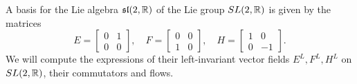 \documentclass[a4paper, 12pt]{article}
\begin{document}
\begin{Exercise}
    A basis for the Lie algebra $\mathfrak{sl}(2, \mathbb{R})$ of the Lie group $SL(2, \mathbb{R})$ is given by the matrices
    \[
        E =
        \begin{bmatrix}
            0 & 1 \\
            0 & 0
        \end{bmatrix},
        \quad
        F =
        \begin{bmatrix}
            0 & 0 \\
            1 & 0
        \end{bmatrix},
        \quad
        H =
        \begin{bmatrix}
            1 & 0 \\
            0 & -1
        \end{bmatrix}.
    \]
    We will compute the expressions of their left-invariant vector fields $E^L, F^L, H^L$ on $SL(2, \mathbb{R})$, their commutators and flows.


\end{Exercise}
\end{document}
